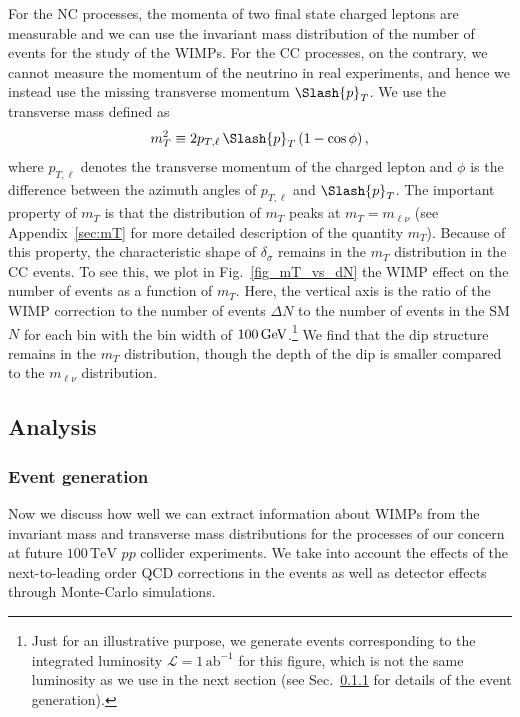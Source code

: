 \documentclass[12pt,twoside,book]{article}
\begin{document}
For the NC processes, the momenta of two final state charged leptons are measurable and we can use the invariant mass distribution of the number of events for the study of the WIMPs.
For the CC processes, on the contrary, we cannot measure the momentum of the neutrino in real experiments, and hence we instead use the missing transverse momentum $\Slash{p}_T$.
We use the transverse mass defined as
\begin{align}
  m_T^2 \equiv 2 p_{T, \ell}\,\Slash{p}_T \left( 1-\cos \phi \right),
\end{align}
where $p_{T, \ell}$ denotes the transverse momentum of the charged lepton and $\phi$ is the difference between the azimuth angles of $p_{T,\ell}$ and $\Slash{p}_T$.
The important property of $m_T$ is that the distribution of $m_T$ peaks at $m_T = m_{\ell\nu}$ (see Appendix~\ref{sec:mT} for more detailed description of the quantity $m_T$).
Because of this property, the characteristic shape of $\delta_\sigma$ remains in the $m_T$ distribution in the CC events.
To see this, we plot in Fig.~\ref{fig_mT_vs_dN} the WIMP effect on the number of events as a function of $m_T$.
Here, the vertical axis is the ratio of the WIMP correction to the number of events $\Delta N$ to the number of events in the SM $N$ for each bin with the bin width of $100\, {\rm GeV}$.\footnote
{
  Just for an illustrative purpose, we generate events corresponding to the integrated luminosity $\mathcal{L} = 1\,\mathrm{ab}^{-1}$ for this figure, which is not the same luminosity as we use in the next section (see Sec.~\ref{sec_event} for details of the event generation).
}
We find that the dip structure remains in the $m_T$ distribution, though the depth of the dip is smaller compared to the $m_{\ell\nu}$ distribution.


\subsection{Analysis}
\label{sec:analysis}


\subsubsection{Event generation}
\label{sec_event}

Now we discuss how well we can extract information about WIMPs from the invariant mass and transverse mass distributions for the processes of our concern at future $100\,\mathrm{TeV}$ $pp$ collider experiments.
We take into account the effects of the next-to-leading order QCD corrections in the events as well as detector effects through Monte-Carlo simulations.
\end{document}
